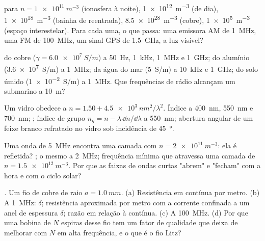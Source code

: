\begin{exercise}[$\star$]\label{exo:b2:waves-in-media:1}
 para $n = \qty{1e11}{m^{-3}}$ (ionosfera à noite),
\qty{1e12}{m^{-3}} (de dia), \qty{1e18}{m^{-3}} (bainha de reentrada), \qty{8.5e28}{m^{-3}}
(cobre), \qty{1e5}{m^{-3}} (espaço interestelar). Para cada uma, o que
passa: uma emissora AM de \qty{1}{MHz}, uma FM de \qty{100}{MHz}, um
sinal GPS de \qty{1.5}{GHz}, a luz visível?
\end{exercise}

\begin{exercise}[$\star$]\label{exo:b2:waves-in-media:2}
 do cobre ($\gamma = \qty{6.0e7}{S/m}$) a \qty{50}{Hz}, \qty{1}{kHz},
\qty{1}{MHz} e \qty{1}{GHz}; do alumínio (\qty{3.6e7}{S/m}) a \qty{1}{MHz}; da água
do mar (\qty{5}{S/m}) a \qty{10}{kHz} e \qty{1}{GHz}; do solo úmido (\qty{1e-2}{S/m})
a \qty{1}{MHz}. Que frequências de rádio alcançam um submarino a \qty{10}{m}?
\end{exercise}

\begin{exercise}[$\star$]\label{exo:b2:waves-in-media:3}
Um vidro obedece a $n = 1.50 + \qty{4.5e3}{nm^2}/\lambda^2$. Índice a \qty{400}{nm},
\qty{550}{nm} e \qty{700}{nm}; ; índice de grupo $n_g = n -
\lambda\,\dd n/\dd\lambda$ a \qty{550}{nm}; abertura angular de um feixe branco
refratado no vidro sob incidência de \qty{45}{\degree}.
\end{exercise}

\begin{exercise}[$\star$]\label{exo:b2:waves-in-media:4}
Uma onda de \qty{5}{MHz} encontra uma camada com $n = \qty{2e11}{m^{-3}}$: ela é
refletida? ; o mesmo a \qty{2}{MHz}; frequência mínima
que atravessa uma camada de $n = \qty{1.5e12}{m^{-3}}$. Por que as faixas de ondas
curtas "abrem" e "fecham" com a hora e com o ciclo solar?
\end{exercise}

\begin{exercise}[$\star\star$]\label{exo:b2:waves-in-media:5}
\emph{.} Um fio de cobre de raio $a = \qty{1.0}{mm}$. (a) Resistência
em contínua por metro. (b) A \qty{1}{MHz}: $\delta$; resistência aproximada
por metro com a corrente confinada a um anel de espessura $\delta$;
razão em relação à contínua. (c) A \qty{100}{MHz}. (d) Por que uma bobina de $N$ espiras
desse fio tem um fator de qualidade que deixa de melhorar com $N$ em alta
frequência, e o que é o fio Litz?
\end{exercise}

